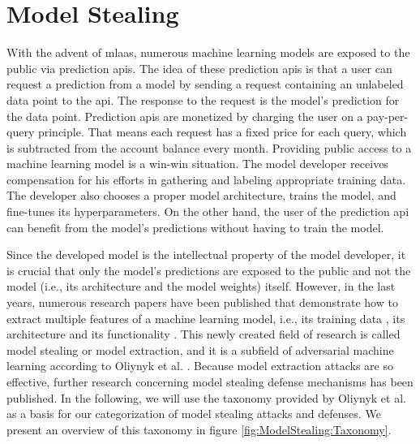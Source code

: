 \section{Model Stealing}
\label{sec:ModelStealing}
With the advent of \gls{mlaas}, numerous machine learning models are exposed to the public via 
prediction \glspl{api}. The idea of these prediction \glspl{api} is that a user can request a prediction from a model by sending a request containing an unlabeled data
point to the \gls{api}. The response to the request is the model's prediction for the data point. Prediction \glspl{api} are monetized by charging the user
on a pay-per-query principle. That means each request has a fixed price for each query, which is subtracted from the account balance every month. 
Providing public access to a machine learning model is a win-win situation. The model developer receives compensation for his efforts in gathering and labeling
appropriate training data. The developer also chooses a proper model architecture, trains the model, and fine-tunes its hyperparameters. On the other hand,
the user of the prediction \gls{api} can benefit from the model's predictions without having to train the model. \par
Since the developed model is the intellectual property of the model developer, it is crucial that only the model's predictions are exposed to the public and
not the model (i.e., its architecture and the model weights) itself. However, in the last years, numerous research papers have been published that demonstrate how
to extract multiple features of a machine learning model, i.e., its
training data \cite{shokri2017membership}, its architecture \cite{oh2019towards} and its functionality \cite{tramer2016stealing}. This newly created field of
research is called model stealing or model extraction, and it is a subfield
of adversarial machine learning according to Oliynyk et al. \cite{oliynyk2022know}. Because model extraction attacks are so effective, further research
concerning model stealing defense mechanisms has been published. In the following, we will use the taxonomy provided by Oliynyk et al. \cite{oliynyk2022know}
as a basis for our categorization of model stealing attacks and defenses. We present an overview of this taxonomy in figure \ref{fig:ModelStealing:Taxonomy}.

